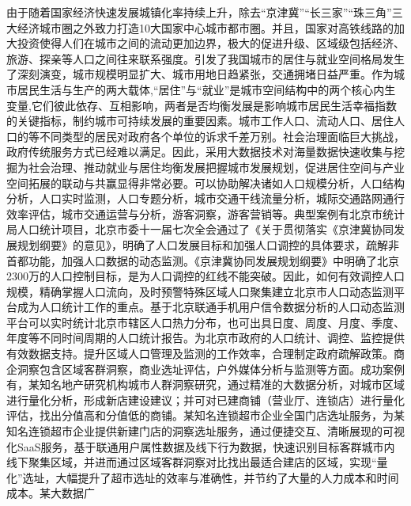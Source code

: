 \indent 由于随着国家经济快速发展城镇化率持续上升，除去“京津冀”“长三家”“珠三角”三大经济城市圈之外致力打造10大国家中心城市都市圈。并且，国家对高铁线路的加大投资使得人们在城市之间的流动更加边界，极大的促进升级、区域级包括经济、旅游、探亲等人口之间往来联系强度。引发了我国城市的居住与就业空间格局发生了深刻演变，城市规模明显扩大、城市用地日趋紧张，交通拥堵日益严重。作为城市居民生活与生产的两大载体,“居住”与“就业”是城市空间结构中的两个核心内生变量,它们彼此依存、互相影响，两者是否均衡发展是影响城市居民生活幸福指数的关键指标，制约城市可持续发展的重要因素。城市工作人口、流动人口、居住人口的等不同类型的居民对政府各个单位的诉求千差万别。社会治理面临巨大挑战，政府传统服务方式已经难以满足。因此，采用大数据技术对海量数据快速收集与挖掘为社会治理、推动就业与居住均衡发展把握城市发展规划，促进居住空间与产业空间拓展的联动与共赢显得非常必要。可以协助解决诸如人口规模分析，人口结构分析，人口实时监测，人口专题分析，城市交通干线流量分析，城际交通路网通行效率评估，城市交通运营与分析，游客洞察，游客营销等。典型案例有北京市统计局人口统计项目，北京市委十一届七次全会通过了《关于贯彻落实《京津冀协同发展规划纲要》的意见》，明确了人口发展目标和加强人口调控的具体要求，疏解非首都功能，加强人口数据的动态监测。《京津冀协同发展规划纲要》中明确了北京2300万的人口控制目标，是为人口调控的红线不能突破。因此，如何有效调控人口规模，精确掌握人口流向，及时预警特殊区域人口聚集建立北京市人口动态监测平台成为人口统计工作的重点。基于北京联通手机用户信令数据分析的人口动态监测平台可以实时统计北京市辖区人口热力分布，也可出具日度、周度、月度、季度、年度等不同时间周期的人口统计报告。为北京市政府的人口统计、调控、监控提供有效数据支持。提升区域人口管理及监测的工作效率，合理制定政府疏解政策。商企洞察包含区域客群洞察，商业选址评估，户外媒体分析与监测等方面。成功案例有，某知名地产研究机构城市人群洞察研究，通过精准的大数据分析，对城市区域进行量化分析，形成新店建设建议；并可对已建商铺（营业厅、连锁店）进行量化评估，找出分值高和分值低的商铺。某知名连锁超市企业全国门店选址服务，为某知名连锁超市企业提供新建门店的洞察选址服务，通过便捷交互、清晰展现的可视化SaaS服务，基于联通用户属性数据及线下行为数据，快速识别目标客群城市内线下聚集区域，并进而通过区域客群洞察对比找出最适合建店的区域，实现“量化”选址，大幅提升了超市选址的效率与准确性，并节约了大量的人力成本和时间成本。某大数据广